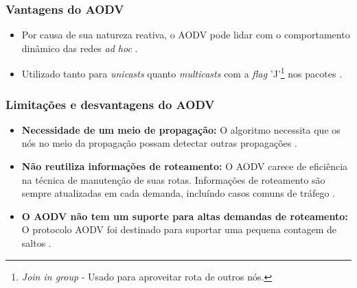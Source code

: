 \subsubsection{Vantagens do AODV}
\begin{itemize}
	\item Por causa de sua natureza reativa, o AODV pode lidar com o comportamento din\^amico das redes \textit{ad hoc} \cite{schwingenschlogl}.
	\item Utilizado tanto para \textit{unicasts} quanto \textit{multicasts} com a \textit{flag} 'J'\footnote{\textit{Join in group} - Usado para aproveitar rota de outros n\'os.} nos pacotes \cite{ramachandranTech}.
\end{itemize}

\subsubsection{Limita\c{c}\~oes e desvantagens do AODV}
\begin{itemize}
	\item \textbf{Necessidade de um meio de propaga\c{c}\~ ao:} O algoritmo necessita que os n\'os no meio da propaga\c{c}\~ ao possam detectar outras propaga\c{c}\~oes \cite{gorantala}.
	\item \textbf{N\~ao reutiliza informa\c{c}\~oes de roteamento:} O AODV carece de efici\^encia na t\'ecnica de manuten\c{c}\~ao de suas rotas. Informa\c{c}\~oes de roteamento s\~ao sempre atualizadas em cada demanda, inclu\'indo casos comuns de tr\'afego \cite{ramachandran}.
	\item \textbf{O AODV n\~ao tem um suporte para altas demandas de roteamento:} O protocolo AODV foi destinado para suportar uma pequena contagem de saltos \cite{ramachandran}.
\end{itemize}
